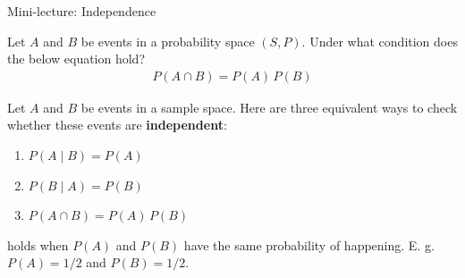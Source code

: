 \documentclass[10pt]{beamer}
\begin{document}
\begin{frame}[standout]
Mini-lecture: Independence
\end{frame}

\begin{frame}

\begin{myredbox}[title=\text{Practice Reading Quiz (Conditional Probability and Independence)}]
Let $A$ and $B$ be events in a probability space $(S,P)$.  Under what condition does the below equation hold?
\begin{align}
P(A \cap B) = P(A) \, P(B)
\label{eqn:independence}
\end{align}
\end{myredbox}
\vfill 

\pause 
\begin{mygreenbox}[title=\text{Three characterizations of independence}]

Let $A$ and $B$ be events in a sample space. Here are three equivalent ways to check whether these events are \textbf{independent}:

\begin{enumerate}
	\item $P(A \mid B) = P(A)$
	\item $P(B \mid A) = P(B)$
	\item $P(A \cap B) = P(A) \, P(B)$
\end{enumerate} 
\end{mygreenbox}

\vfill 
\pause 
\begin{myyellowbox}[title=\text{Poll: What do you think about this answer?}]

 holds  when $P(A)$ and $P(B)$ have the same probability of happening.  E. g. $P(A)=1/2$ and $P(B)=1/2$.
\end{myyellowbox}

\end{frame}
\end{document}
